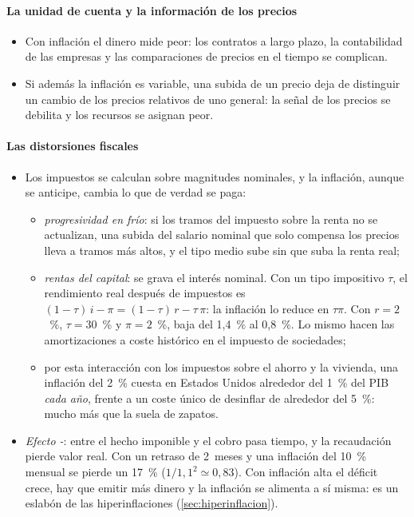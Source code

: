 \documentclass[11pt]{article}
\begin{document}
\paragraph{La unidad de cuenta y la información de los precios}

\begin{itemize}
\item Con inflación el dinero mide peor: los contratos a largo plazo, la contabilidad de las empresas y las comparaciones de precios en el tiempo se complican.
\item Si además la inflación es variable, una subida de un precio deja de distinguir un cambio de los precios relativos de uno general: la señal de los precios se debilita y los recursos se asignan peor\nocite{Lucas1973Some,Friedman1977Nobel}.
\end{itemize}

\paragraph{Las distorsiones fiscales}

\begin{itemize}
\item Los impuestos se calculan sobre magnitudes nominales, y la inflación, aunque se anticipe, cambia lo que de verdad se paga:
  \begin{itemize}
  \item \emph{progresividad en frío}: si los tramos del impuesto sobre la renta no se actualizan, una subida del salario nominal que solo compensa los precios lleva a tramos más altos, y el tipo medio sube sin que suba la renta real;
  \item \emph{rentas del capital}: se grava el interés nominal. Con un tipo impositivo $\tau$, el rendimiento real después de impuestos es $(1-\tau)\,i-\pi=(1-\tau)\,r-\tau\,\pi$: la inflación lo reduce en $\tau\pi$. Con $r=2$~\%, $\tau=30$~\% y $\pi=2$~\%, baja del 1,4~\% al 0,8~\%. Lo mismo hacen las amortizaciones a coste histórico en el impuesto de sociedades;
  \item por esta interacción con los impuestos sobre el ahorro y la vivienda, una inflación del 2~\% cuesta en Estados Unidos alrededor del 1~\% del PIB \emph{cada año}, frente a un coste único de desinflar de alrededor del 5~\%\nocite{Feldstein1997Costs}: mucho más que la suela de zapatos.
  \end{itemize}
\item \emph{Efecto -}: entre el hecho imponible y el cobro pasa tiempo, y la recaudación pierde valor real. Con un retraso de 2~meses y una inflación del 10~\% mensual se pierde un 17~\% ($1/1{,}1^2\simeq0{,}83$). Con inflación alta el déficit crece, hay que emitir más dinero y la inflación se alimenta a sí misma\nocite{Olivera1967Money,Tanzi1977Inflation}: es un eslabón de las hiperinflaciones (\ref{sec:hiperinflacion}).
\end{itemize}
\end{document}
